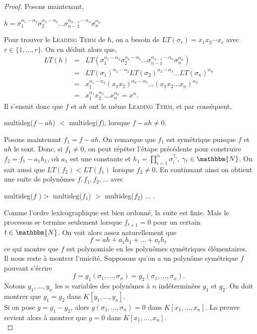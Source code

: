 \documentclass[12pt]{article}
\theoremstyle{remark}\newtheorem{note}{Note}
\theoremstyle{remark}\newtheorem{nota}{Notation}
\theoremstyle{definition}
\begin{document}
\begin{proof}
Posons maintenant,
\begin{center}
$h=\sigma_1^{\alpha_1 - \alpha_2} \sigma_2^{\alpha_2 - \alpha_3} \ldots \sigma_{n-1}^{\alpha_{n-1}-\alpha_n} \sigma_n^{\alpha_n}$
\end{center}
Pour trouver le \textsc{Leading Term} de $h$, on a besoin de $LT(\sigma_r)=x_1x_2 \cdots x_r$ avec $r \in \lbrace 1, \ldots , r \rbrace$. On en déduit alors que, 
\begin{eqnarray}
LT(h) &=& LT( \sigma_1^{\alpha_1 - \alpha_2} \sigma_2^{\alpha_2 - \alpha_3} \ldots \sigma_{n-1}^{\alpha_{n-1}-\alpha_n} \sigma_n^{\alpha_n}) \nonumber \\
&=& LT(\sigma_1)^{\alpha_1 - \alpha_2}LT(\sigma_2)^{\alpha_2 - \alpha_3} \ldots LT(\sigma_n)^{\alpha_n} \nonumber \\
&=& x_1^{\alpha_1 - \alpha_2}(x_1x_2)^{\alpha_2 - \alpha_3} \ldots (x_1x_2 \ldots x_n)^{\alpha_n} \nonumber \\ 
&=& x_1^{\alpha_1}x_2^{\alpha_2} \ldots x_n^{\alpha_n} = x^\alpha . \nonumber
\end{eqnarray}
Il s'ensuit donc que $f$ et $ah$ ont le même \textsc{Leading Term}, et par conséquent,
\begin{center}
multideg($f-ah$) $<$ multideg($f$), lorsque $f-ah \neq 0$.
\end{center}
\vspace{12pt}Posons maintenant $f_1 = f - ah$. On remarque que $f_1$ est symétrique puisque $f$ et $ah$ le sont. Donc, si $f_1 \neq 0$, on peut répéter l'étape précédente pour construire $f_2 = f_1 - a_1h_1$, où $a_1$ est une constante et $h_1 = \displaystyle \prod_{i=1}^{n} \sigma_i^{\gamma_i}$, $\gamma_i \in \mathbbm{N}$. On sait aussi que $LT(f_2)<LT(f_1)$ lorsque $f_2 \neq 0$. En continuant ainsi on obtient une suite de polynômes $f, f_1, f_2, \ldots$ avec
\begin{center}
multideg($f$ )$>$ multideg($f_1$) $>$ multideg($f_2$) $\ldots$ .
\end{center}
Comme l'ordre lexicographique est bien ordonné, la suite est finie. Mais le processus se termine seulement lorsque $f_{t+1}=0$ pour un certain $t \in \mathbbm{N}$. On voit alors assez naturellement que 
$$f = ah + a_1h_1 + \ldots + a_th_t\,$$
ce qui montre que $f$ est polynomiale en les polynômes symétriques élémentaires.
\\

Il nous reste à montrer l'unicité. Supposons qu'on a un polynôme symétrique $f$ pouvant s'écrire
$$f=g_1(\sigma_1, \ldots , \sigma_n) = g_2(\sigma_1, \ldots , \sigma_n).$$
Notons $y_1, \ldots , y_n$ les $n$ variables des polynômes à $n$ indéterminées $g_1$ et $g_2$. On doit montrer que $g_1 = g_2$ dans $K \left[  y_1, \ldots , y_n \right] $.\\
Si on pose $g = g_1 - g_2$, alors $g(\sigma_1 , \ldots , \sigma_n) = 0$ dans $K \left[ x_1, \ldots , x_n \right] $. La preuve revient alors à montrer que $g=0$ dans $K \left[ x_1, \ldots , x_n \right]$.\\


\end{proof}
\end{document}
